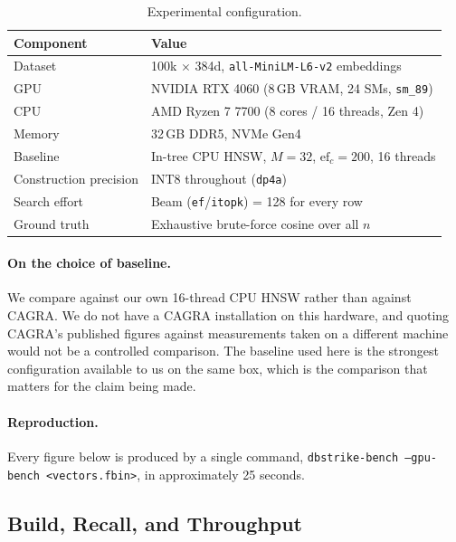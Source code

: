 \documentclass[11pt,twocolumn]{article}
\begin{document}
\begin{table}[ht]
\centering
\caption{Experimental configuration.}
\label{tab:setup}
\small
\begin{tabular}{ll}
\toprule
\textbf{Component} & \textbf{Value} \\
\midrule
Dataset & 100k $\times$ 384d, \texttt{all-MiniLM-L6-v2} embeddings \\
GPU & NVIDIA RTX 4060 (8\,GB VRAM, 24 SMs, \texttt{sm\_89}) \\
CPU & AMD Ryzen 7 7700 (8 cores / 16 threads, Zen 4) \\
Memory & 32\,GB DDR5, NVMe Gen4 \\
Baseline & In-tree CPU HNSW, $M{=}32$, $\text{ef}_c{=}200$, 16 threads \\
Construction precision & INT8 throughout (\texttt{dp4a}) \\
Search effort & Beam (\texttt{ef}/\texttt{itopk}) = 128 for every row \\
Ground truth & Exhaustive brute-force cosine over all $n$ \\
\bottomrule
\end{tabular}
\end{table}

\paragraph{On the choice of baseline.} We compare against our own 16-thread CPU
HNSW rather than against CAGRA. We do not have a CAGRA installation on this
hardware, and quoting CAGRA's published figures against measurements taken on a
different machine would not be a controlled comparison. The baseline used here
is the strongest configuration available to us on the same box, which is the
comparison that matters for the claim being made.

\paragraph{Reproduction.} Every figure below is produced by a single command,
\texttt{dbstrike-bench --gpu-bench <vectors.fbin>}, in approximately 25 seconds.

\subsection{Build, Recall, and Throughput}
\label{sec:mainresults}
\end{document}
